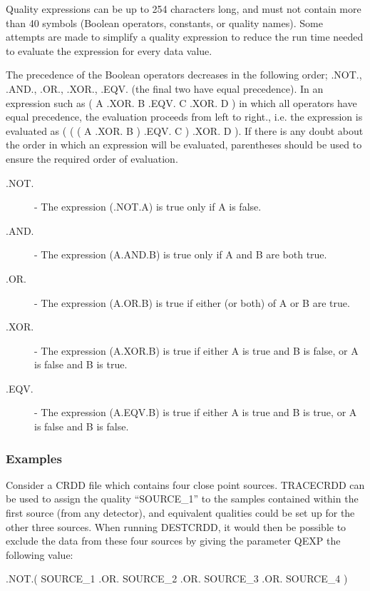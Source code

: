 \documentclass[11pt,nolof,noabs]{starlink}
\begin{document}
Quality expressions can be up to 254 characters long, and must
not contain more than 40 symbols (Boolean operators, constants,
or quality names). Some attempts are made to simplify a quality
expression to reduce the run time needed to evaluate the
expression for every data value.

The precedence of the Boolean  operators decreases in the following
order; .NOT., .AND., .OR., .XOR., .EQV. (the final two have equal
precedence). In an expression such as ( A .XOR. B .EQV. C .XOR. D ) in
which all operators have equal precedence, the evaluation proceeds from
left to right., i.e. the expression is evaluated as ( ( ( A .XOR. B )
.EQV. C ) .XOR. D ). If there is any doubt about the order in which an
expression will be evaluated, parentheses should be used to ensure the
required order of evaluation.

\begin{description}
\item [.NOT.] -
The expression (.NOT.A) is true only if A is false.

\item [.AND.] -
The expression (A.AND.B) is true only if A and B are both true.

\item [.OR.] -
The expression (A.OR.B) is true if either (or both) of A or B are
true.

\item [.XOR.] -
The expression (A.XOR.B) is true if either A is true and B is
false, or A is false and B is true.

\item [.EQV.] -
The expression (A.EQV.B) is true if either A is true and B is
true, or A is false and B is false.
\end{description}

\subsubsection{Examples}
Consider a {\small CRDD} file which contains four close point sources.
{\small TRACECRDD} can be  used to assign the quality ``SOURCE\_1'' to
the samples contained within the  first source (from any
detector), and equivalent qualities could be set up for the other three
sources. When running {\small DESTCRDD}, it would then be possible to
exclude the data from these four sources by giving the parameter
{\small QEXP} the following value:

\small
\begin{terminalv}
.NOT.( SOURCE_1 .OR. SOURCE_2 .OR. SOURCE_3 .OR. SOURCE_4 )
\end{terminalv}
\normalsize
\end{document}
